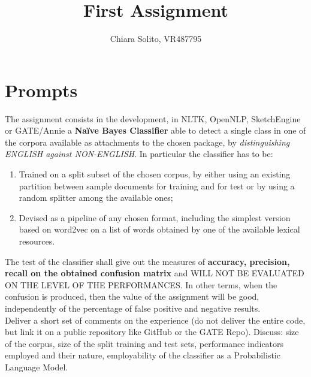 \documentclass{article}
\begin{document}
    \title{\textbf{First Assignment}}
    \date{}
    \author{Chiara Solito, VR487795}
    \maketitle

    \section{Prompts}
    The assignment consists in the development, in NLTK, OpenNLP, SketchEngine or GATE/Annie a \textbf{Naïve Bayes Classifier} able to detect a single class in one of the corpora available as attachments to the chosen package, by \textit{distinguishing ENGLISH against NON-ENGLISH}. In particular the classifier has to be:
        \begin{enumerate}
            \item Trained on a split subset of the chosen corpus, by either using an existing partition between sample documents for training and for test or by using a random splitter among the available ones;
            \item Devised as a pipeline of any chosen format, including the simplest version based on word2vec on a list of words obtained by one of the available lexical resources.
        \end{enumerate}
    The test of the classifier shall give out the measures of \textbf{accuracy, precision, recall on the obtained confusion matrix} and WILL NOT BE EVALUATED ON THE LEVEL OF THE PERFORMANCES. In other terms, when the confusion is produced, then the value of the assignment will be good, independently of the percentage of false positive and negative results.\\

    Deliver a short set of comments on the experience (do not deliver the entire code, but link it on a public repository like GitHub or the GATE Repo).
    Discuss: size of the corpus, size of the split training and test sets, performance indicators employed and their nature, employability of the classifier as a Probabilistic Language Model.
\end{document}
